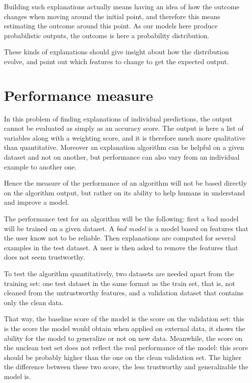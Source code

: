 \documentclass[a4paper,11pt]{kth-mag}
\begin{document}
Building such explanations actually means having an idea of how the outcome changes when moving around the initial point, and therefore this means estimating the outcome around this point. As our models here produce probabilistic outputs, the outcome is here a probability distribution.

These kinds of explanations should give insight about how the distribution evolve, and point out which features to change to get the expected output.


\section{Performance measure}

In this problem of finding explanations of individual predictions, the output cannot be evaluated as simply as an accuracy score. The output is here a list of variables along with a weighting score, and it is therefore much more qualitative than quantitative. Moreover an explanation algorithm can be helpful on a given dataset and not on another, but performance can also vary from an individual example to another one.

Hence the measure of the performance of an algorithm will not be based directly on the algorithm output, but rather on its ability to help humans in understand and improve a model.

The performance test for an algorithm will be the following: first a bad model will be trained on a given dataset. A \textit{bad model} is a model based on features that the user know not to be reliable. Then explanations are computed for several examples in the test dataset. A user is then asked to remove the features that does not seem trustworthy.

To test the algorithm quantitatively, two datasets are needed apart from the training set: one test dataset in the same format as the train set, that is, not cleaned from the untrustworthy features, and a validation dataset that contains only the clean data.

That way, the baseline score of the model is the score on the validation set: this is the score the model would obtain when applied on external data, it shows the ability for the model to generalize or not on new data. Meanwhile, the score on the unclean test set does not reflect the real performance of the model: this score should be probably higher than the one on the clean validation set. The higher the difference between these two score, the less trustworthy and generalizable the model is.
\end{document}
